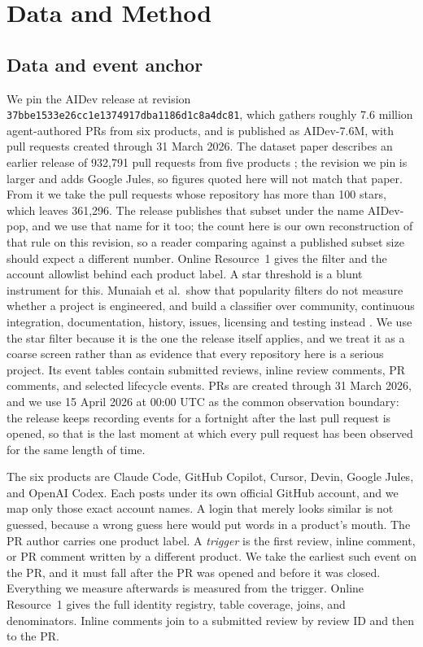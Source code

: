 \documentclass[lineno,pdflatex,sn-basic]{sn-jnl}
\begin{document}
\section{Data and Method}\label{sec:method}

\subsection{Data and event anchor}

We pin the AIDev release at revision
\nolinkurl{37bbe1533e26cc1e1374917dba1186d1c8a4dc81}, which gathers roughly 7.6
million agent-authored PRs from six products, and is published as AIDev-7.6M,
with pull requests created through
31 March 2026. The dataset paper describes an earlier release of 932,791 pull
requests from five products \citep{li2026aidev}; the revision we pin is larger
and adds Google Jules, so figures quoted here will not match that paper. From it we take the pull requests whose repository has more than 100 stars,
which leaves 361,296. The release publishes that subset under the name
AIDev-pop, and we use that name for it too; the count
here is our own reconstruction of that rule on this revision, so a reader
comparing against a published subset size should expect a different number.
Online Resource~1 gives the filter and the account allowlist behind each
product label. A star threshold is a blunt instrument for this. Munaiah et al.\ show that
popularity filters do not measure whether a project is engineered, and build a
classifier over community, continuous integration, documentation, history,
issues, licensing and testing instead \citep{munaiah2017curating}. We use the
star filter because it is the one the release itself applies, and we treat it as
a coarse screen rather than as evidence that every repository here is a serious
project. Its event tables contain submitted
reviews, inline review comments, PR comments, and selected lifecycle events.
PRs are created through 31 March 2026, and we use 15 April 2026 at 00:00 UTC as
the common observation boundary: the release keeps recording events for a
fortnight after the last pull request is opened, so that is the last moment at
which every pull request has been observed for the same length of time.

The six products are Claude Code, GitHub Copilot, Cursor, Devin, Google Jules,
and OpenAI Codex. Each posts under its own official GitHub account, and we map
only those exact account names. A login that merely looks similar is not guessed,
because a wrong guess here would put words in a product's mouth. The PR author carries one product
label. A \emph{trigger} is the first review, inline comment, or PR comment
written by a different product. We take the earliest such event on the PR, and it
must fall after the PR was opened and before it was closed. Everything we measure
afterwards is measured from the trigger. Online Resource~1 gives the full identity registry,
table coverage, joins, and denominators. Inline comments join to a submitted
review by review ID and then to the PR.
\end{document}
